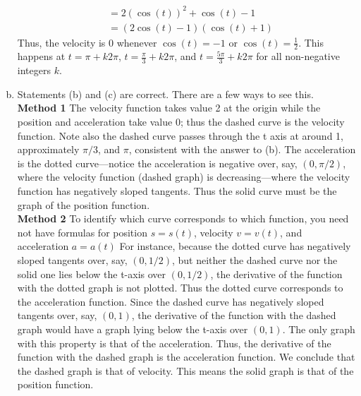 \documentclass[11pt]{exam}
\begin{document}
\begin{questions}
\begin{solution}
\begin{enumerate}[(a)]
\begin{align*}
              & = 2(\cos(t))^2+\cos(t)-1\\
        & = (2\cos(t)-1)(\cos(t)+1)
      \end{align*}
      Thus, the velocity is \(0\) whenever \(\cos(t) = -1\) or
      \(\cos(t) = \frac{1}{2}\). This happens at \(t = \pi+k 2\pi\), 
      \(t = \frac{\pi}{3}+k 2\pi\), and \(t = \frac{5\pi}{3}+k 2\pi\)
      for all non-negative integers \(k\).
    \item Statements (b) and (c) are correct. There are a few ways to
      see this.\\
    {\bf Method 1} The velocity function takes value 2 at the origin while the position 
and acceleration take value 0; thus the dashed curve is the velocity
function.  Note also the dashed curve passes through the t axis at 
around 1, approximately \(\pi/3\), and \(\pi\), consistent with the answer to (b). The 
acceleration is the dotted curve—notice the acceleration is negative 
over, say, \((0, \pi/2)\), where  the velocity function (dashed graph) is 
decreasing—where the velocity function has negatively sloped 
tangents.  Thus the solid curve must be the graph of the position 
function.\\
    {\bf Method 2} To identify which curve corresponds to which function, you need not have formulas for position \(s=s(t)\), 
velocity \(v = v(t)\), and acceleration \(a = a(t)\)  For instance, because the dotted curve has negatively sloped 
tangents over, say, \((0, 1/2)\), but neither the dashed curve nor the solid one lies below the t-axis over \((0, 1/2)\), 
the derivative of the function with the dotted graph is not plotted.  Thus the dotted curve corresponds to 
the acceleration function.  Since the dashed curve has negatively sloped tangents over, say, \((0,1)\), the 
derivative of the function with the dashed graph would have a graph lying below the t-axis over \((0, 1)\).   The 
only graph with this property is that of the acceleration.   Thus, the derivative of the function with the 
dashed graph is  the acceleration function.   We conclude that the dashed graph is that  of velocity.  This 
means the solid graph is that of the position function.  
    \end{enumerate}
  \end{solution}
\end{questions}
\end{document}
